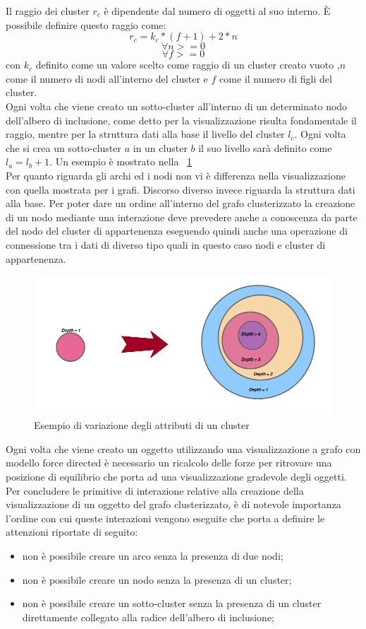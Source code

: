 {Il raggio dei cluster $r_c$ è dipendente dal numero di oggetti al suo interno. È possibile definire questo raggio come: 
$$r_c=k_c*( f+1 )+2*n$$ 
$$\forall n>=0$$
$$ \forall f>=0$$
con $k_c$ definito come un valore scelto come raggio di un cluster creato vuoto ,$n$ come il numero di nodi all'interno del cluster e $f$ come il numero di figli del cluster.\\
Ogni volta che viene creato un sotto-cluster all'interno di un determinato nodo dell'albero di inclusione, come detto per la visualizzazione risulta fondamentale il raggio, mentre per la struttura dati alla base il livello del cluster $l_c$. Ogni volta che si crea un sotto-cluster $a$ in un cluster $b$ il suo livello sarà definito come $l_a= l_b+1$. Un esempio è mostrato nella \figurename~\ref{fig:livelli}\\
Per quanto riguarda gli archi ed i nodi non vi è differenza nella visualizzazione con quella mostrata per i grafi. Discorso diverso invece riguarda la struttura dati alla base. Per poter dare un ordine all'interno del grafo clusterizzato la creazione di un nodo mediante una interazione deve prevedere anche a conoscenza da parte del nodo del cluster di appartenenza eseguendo quindi anche una operazione di connessione tra i dati di diverso tipo quali in questo caso nodi e cluster di appartenenza.
\begin{figure}[!htb]
	\begin{center}
		\includegraphics[width=0.9 \linewidth]{figure/livelli}
	\end{center}
	\caption{Esempio di variazione degli attributi di un cluster \label{fig:livelli}}
\end{figure}
Ogni volta che viene creato un oggetto utilizzando una visualizzazione a grafo con modello force directed è necessario un ricalcolo delle forze per ritrovare una posizione di equilibrio che porta ad una visualizzazione gradevole degli oggetti.
Per concludere le primitive di interazione relative alla creazione della visualizzazione di un oggetto del grafo clusterizzato, è di notevole importanza l'ordine con cui queste interazioni vengono eseguite che porta a definire le attenzioni riportate di seguito:
\begin{itemize}
	\item non è possibile creare un arco senza la presenza di due nodi;
	\item non è possibile creare un nodo senza la presenza di un cluster;
	\item non è possibile creare un sotto-cluster senza la presenza di un cluster direttamente collegato alla radice dell'albero di inclusione;
\end{itemize}
}
